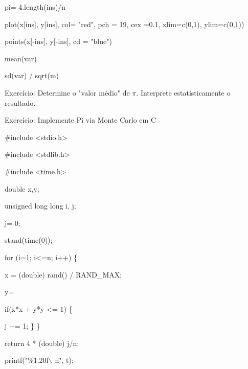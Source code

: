 \documentclass[a4paper, 12pt]{article}
\begin{document}
pi= 4.length(ins)/n

plot(x[ins], y[ins], col= "red", pch = 19, cex =0.1, xlim=c(0,1), ylim=c(0,1))

points(x[-ins], y[-ins], cd = "blue")

mean(var)

sd(var) / sqrt(m)

Exercício: Determine o "valor médio" de $\pi$. Interprete estatísticamente o resultado.

Exercício: Implemente Pi via Monte Carlo em C

\#include <stdio.h>

\#include <stdlib.h>

\#include <time.h>

double x,y;

unsigned long long i, j;

j= 0;

stand(time(0));

for (i=1; i<=n; i++) \{

x = (double) rand() / RAND\_MAX;

y=

if(x*x + y*y <= 1) \{

j += 1;
\}
\}

return 4 * (double) j/n;

printf("\%1.20f$\backslash$ n", t);
\end{document}
